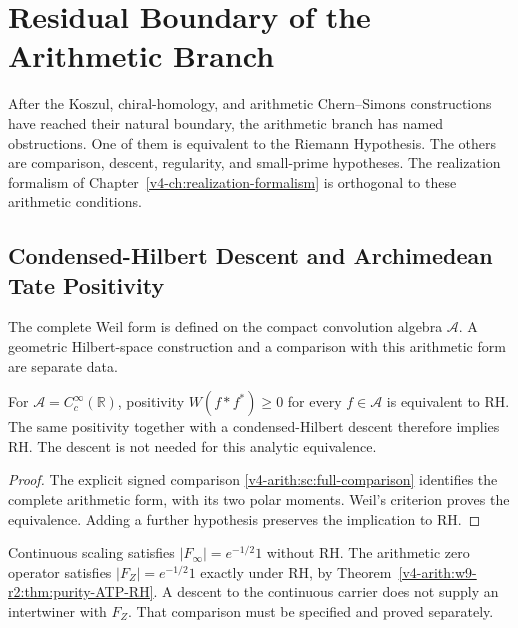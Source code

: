 \chapter{Residual Boundary of the Arithmetic Branch}
\label{v4-arith:w10-final:chapter}

After the Koszul, chiral-homology, and arithmetic Chern--Simons
constructions have reached their natural boundary, the arithmetic
branch has named obstructions. One of them is equivalent to the
Riemann Hypothesis. The others are comparison, descent, regularity, and
small-prime hypotheses. The realization formalism of
Chapter~\ref{v4-ch:realization-formalism} is orthogonal to these
arithmetic conditions.

\section{Condensed-Hilbert Descent and Archimedean Tate Positivity}
\label{v4-arith:w10-final:w10-a}

The complete Weil form is defined on the compact convolution algebra
$\mathscr A$. A geometric Hilbert-space construction and a comparison
with this arithmetic form are separate data.

\begin{theorem}
\label{v4-arith:w10-final:thm:cs-descent-atp-rh}
For $\mathscr A=C_c^\infty(\mathbb R)$, positivity
$W(f*f^*)\ge0$ for every $f\in\mathscr A$ is equivalent to RH.
The same positivity together with a condensed-Hilbert descent therefore
implies RH. The descent is not needed for this analytic equivalence.
\end{theorem}
\begin{proof}
The explicit signed comparison \eqref{v4-arith:sc:full-comparison}
identifies the complete arithmetic form, with its two polar moments.
Weil's criterion proves the equivalence. Adding a further hypothesis
preserves the implication to RH.
\end{proof}

\begin{remark}
\label{v4-arith:w10-final:rem:w10-a-shape}
Continuous scaling satisfies $|F_\infty|=e^{-1/2}1$ without RH.
The arithmetic zero operator satisfies $|F_Z|=e^{-1/2}1$ exactly
under RH, by Theorem~\ref{v4-arith:w9-r2:thm:purity-ATP-RH}.
A descent to the continuous carrier does not supply an intertwiner
with $F_Z$. That comparison must be specified and proved separately.
\end{remark}


